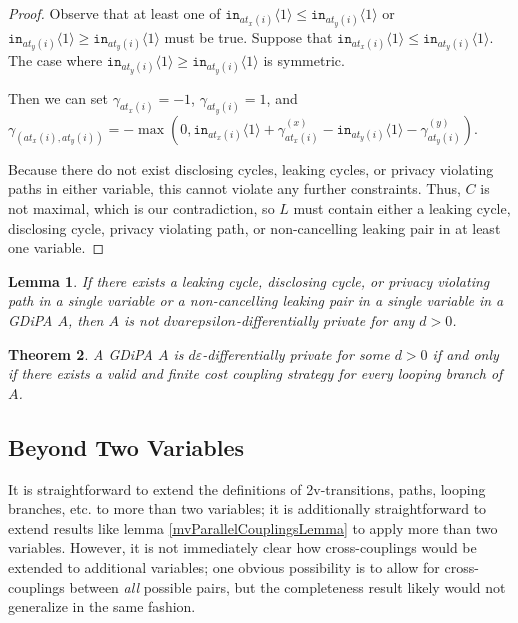\documentclass[12pt]{article}
\newcommand{\brangle}[1]{\langle#1 \rangle}
\newtheorem{thm}{Theorem}[section]
\newtheorem{lemma}[thm]{Lemma}
\theoremstyle{definition}
\begin{document}
\begin{proof}
    Observe that at least one of $\texttt{in}_{at_x(i)}\brangle{1}\leq \texttt{in}_{at_y(i)}\brangle{1}$ or $\texttt{in}_{at_y(i)}\brangle{1}\geq \texttt{in}_{at_y(i)}\brangle{1}$ must be true. Suppose that $\texttt{in}_{at_x(i)}\brangle{1}\leq \texttt{in}_{at_y(i)}\brangle{1}$. The case where $\texttt{in}_{at_y(i)}\brangle{1}\geq \texttt{in}_{at_y(i)}\brangle{1}$ is symmetric. 

    Then we can set $\gamma_{at_x(i)} = -1$, $\gamma_{at_y(i)}=1$, and $\gamma_{(at_x(i), at_y(i))} =  -\max(0, \texttt{in}_{at_x(i)}\brangle{1}+ \gamma_{at_x(i)}^{(x)}-\texttt{in}_{at_y(i)}\brangle{1}-\gamma_{at_y(i)}^{(y)})$. 
    
    Because there do not exist disclosing cycles, leaking cycles, or privacy violating paths in either variable, this cannot violate any further constraints. Thus, $C$ is not maximal, which is our contradiction, so $L$ must contain either a leaking cycle, disclosing cycle, privacy violating path, or non-cancelling leaking pair in at least one variable.
\end{proof}

\begin{lemma}
    If there exists a leaking cycle, disclosing cycle, or privacy violating path in a single variable or a non-cancelling leaking pair in a single variable in a GDiPA $A$, then $A$ is not $dvarepsilon$-differentially private for any $d>0$. 
\end{lemma}

\begin{thm}
    A GDiPA $A$ is $d\varepsilon$-differentially private for some $d>0$ if and only if there exists a valid and finite cost coupling strategy for every looping branch of $A$. 
\end{thm}

\subsection{Beyond Two Variables}

It is straightforward to extend the definitions of 2v-transitions, paths, looping branches, etc. to more than two variables; it is additionally straightforward to extend results like lemma \ref{mvParallelCouplingsLemma} to apply more than two variables. However, it is not immediately clear how cross-couplings would be extended to additional variables;
one obvious possibility is to allow for cross-couplings between \textit{all} possible pairs, but the completeness result likely would not generalize in the same fashion. 
\end{document}
